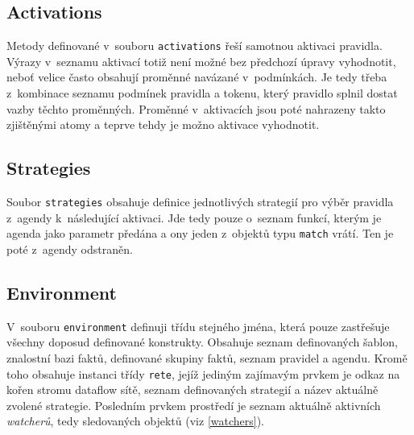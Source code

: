 \subsection{Activations}
Metody definované v~souboru \verb|activations| řeší samotnou aktivaci pravidla.
Výrazy v~seznamu aktivací totiž není možné bez předchozí úpravy vyhodnotit,
neboť velice často obsahují proměnné navázané v~podmínkách. Je tedy třeba
z~kombinace seznamu podmínek pravidla a tokenu, který pravidlo splnil dostat
vazby těchto proměnných. Proměnné v~aktivacích jsou poté nahrazeny takto
zjištěnými atomy a teprve tehdy je možno aktivace vyhodnotit.
\subsection{Strategies}
Soubor \verb|strategies| obsahuje definice jednotlivých strategií pro výběr
pravidla z~agendy k~následující aktivaci. Jde tedy pouze o~seznam funkcí,
kterým je agenda jako parametr předána a ony jeden z~objektů typu \verb|match|
vrátí. Ten je poté z~agendy odstraněn.
\subsection{Environment}
V~souboru \verb|environment| definuji třídu stejného jména, která pouze
zastřešuje všechny doposud definované konstrukty. Obsahuje seznam definovaných
šablon, znalostní bazi faktů, definované skupiny faktů, seznam pravidel
a agendu. Kromě toho obsahuje instanci třídy \verb|rete|, jejíž jediným
zajímavým prvkem je odkaz na kořen stromu dataflow sítě, seznam definovaných
strategií a název aktuálně zvolené strategie. Posledním prvkem prostředí
je seznam aktuálně aktivních \emph{watcherů}, tedy sledovaných objektů
(viz \ref{watchers}).
